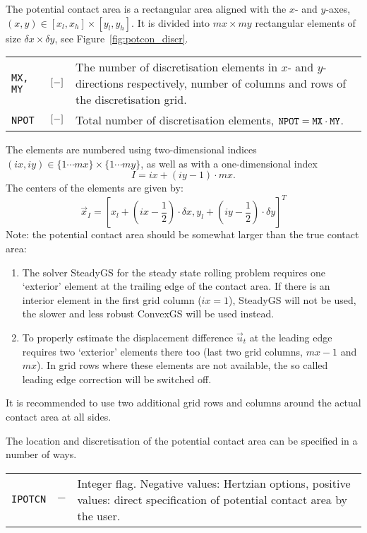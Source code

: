 \documentclass[12pt]{report}
\newenvironment{inputvars}{\vspace{0.4\baselineskip}%

\begin{tabular}{>{\raggedright}p{22mm}p{19mm}p{113mm}}}{
\end{tabular}

}
\newcommand{\inpvar}[3]{{\small\tt #1} & $#2$ & #3 \\[1ex]}
\begin{document}
The potential contact area is a rectangular area aligned with the $x$- and
$y$-axes, $(x,y)\in[x_l,x_h] \times[y_l,y_h]$. It is divided into
$mx\times my$ rectangular elements of size $\delta x\times\delta y$, see
Figure~\ref{fig:potcon_discr}.
\begin{inputvars}
\inpvar{MX, MY}{\bunit{-}}{The number of discretisation elements in $x$- and
        $y$-directions respectively, number of columns and rows of the
        discretisation grid.}
\inpvar{NPOT}{\bunit{-}}{Total number of discretisation elements, ${\tt
        NPOT}={\tt MX}\cdot {\tt MY}$.}
\end{inputvars}
The elements are numbered using two-dimensional indices $(ix,iy)\in
\{1\cdots mx\}\times\{1\cdots my\}$, as well as with a one-dimensional
index
\begin{equation}\label{eq:1d_index}
        I=ix+(iy-1)\cdot mx .
\end{equation}
The centers of the elements are given by:
\begin{equation}\label{eq:x_i}
   \vec{x}_I = \left[ x_l+(ix-\frac{1}{2})\cdot \delta x,
                y_l+(iy-\frac{1}{2})\cdot \delta y \right]^T
\end{equation}
Note: the potential contact area should be somewhat larger than the true
contact area:
\begin{enumerate}
\item The solver SteadyGS for the steady state rolling problem requires one
        `exterior' element at the trailing edge of the contact area. If
        there is an interior element in the first grid column ($ix=1$),
        SteadyGS will not be used, the slower and less robust ConvexGS will
        be used instead.
\item To properly estimate the displacement difference $\vec{u}_t$ at the
        leading edge requires two `exterior' elements there too (last two
        grid columns, $mx-1$ and $mx$). In grid rows where these
        elements are not available, the so called leading edge correction
        will be switched off.
\end{enumerate}
It is recommended to use two additional grid rows and columns around the
actual contact area at all sides.

The location and discretisation of the potential contact area can be
specified in a number of ways.
\begin{inputvars}
\inpvar{IPOTCN}{-}{Integer flag. Negative values: Hertzian options,
        positive values: direct specification of potential contact area
        by the user.}
\end{inputvars}
\end{document}
